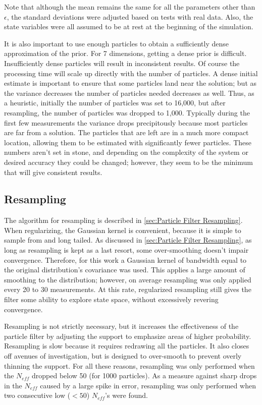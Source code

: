 Note that although the mean remains the same for all the
parameters other than $\epsilon$, the standard deviations were
adjusted based on tests with real data. Also, the state variables
were all assumed to be at rest at the beginning of the simulation.

It is also important to use enough particles to obtain a
sufficiently dense approximation of the prior. For 7 dimensions,
getting a dense prior is difficult. Insufficiently
dense particles will result in inconsistent results. Of course the
processing time will scale up directly with the number of particles.
A dense initial estimate is important to ensure that some particles land
near the solution; but as the variance decreases the number of
particles needed decreases as well. Thus, as a heuristic, initially
the number of particles was set to 16,000, but after resampling,
the number of particles was dropped to 1,000. Typically during the
first few measurements the variance drops precipitously because
most particles are far from a solution.  The particles that are left are in a
much more compact location, allowing them to be estimated with
significantly fewer particles. These numbers aren't set in stone,
and depending on the complexity of the system or desired accuracy
they could be changed; however, they seem to be the minimum that
will give consistent results.

\subsection{Resampling}
\label{sec:Resampling}
The algorithm for resampling is described in \autoref{sec:Particle Filter Resampling}.
When regularizing, the Gaussian kernel is convenient,
because it is simple to sample from and long tailed.
As discussed in \autoref{sec:Particle Filter Resampling},
as long as resampling is kept as a last resort, some over-smoothing
doesn't impair convergence. Therefore, for this work a Gaussian kernel of
bandwidth equal to the original distribution's covariance was used. This
applies a large amount of smoothing to the distribution; however, on average
resampling was only applied every 20 to 30 measurements. At this rate,
regularized resampling still gives the filter some ability to explore
state space, without excessively revering convergence.

Resampling is not strictly necessary, but it increases the effectiveness
of the particle filter by adjusting the support to emphasize areas
of higher probability. Resampling is slow because it requires redrawing
all the particles. It also closes off avenues of investigation, but is
designed to over-smooth to prevent overly thinning the support. For all these
reasons, resampling was only performed when the $N_{eff}$ dropped below
50 (for 1000 particles).  As a measure against sharp drops in the $N_{eff}$
caused by a large spike in error, resampling was only performed when
two consecutive low ($<50$) $N_{eff}$'s were found.

